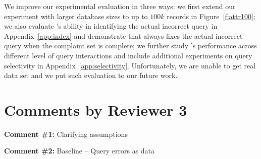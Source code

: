 We improve our experimental evaluation in three ways: we first extend our
experiment with larger database sizes to up to $100k$ records in
Figure~\ref{f:attr100}; we also evaluate \sys's ability in identifying the
actual incorrect query in Appendix~\ref{app:index} and demonstrate that \sys
always fixes the actual incorrect query when the complaint set is complete; we
further study \sys's performance across different level of query interactions
and include additional experiments on query selectivity in
Appendix~\ref{app:selectivity}. Unfortunately, we are unable to get real data
set and we put such evaluation to our future work.



\section*{Comments by Reviewer 3}

\noindent
\textbf{Comment \#1:} Clarifying assumptions
\begin{quote}
\end{quote}



\comskip

\noindent
\textbf{Comment \#2:} Baseline -- Query errors as data
\begin{quote}
\end{quote}

